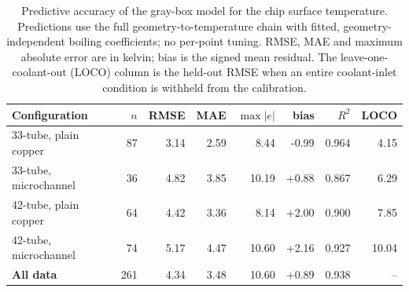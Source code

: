 \begin{table}[t]
\centering
\caption{Predictive accuracy of the gray-box model for the chip surface
temperature. Predictions use the full geometry-to-temperature chain with
fitted, geometry-independent boiling coefficients; no per-point tuning.
RMSE, MAE and maximum absolute error are in kelvin; bias is the signed mean
residual. The leave-one-coolant-out (LOCO) column is the held-out RMSE when an
entire coolant-inlet condition is withheld from the calibration.}
\label{tab:accuracy}
\begin{tabular}{lrrrrrrr}
\toprule
Configuration & $n$ & RMSE & MAE & $\max|e|$ & bias & $R^2$ & LOCO \\
\midrule
33-tube, plain copper & 87 & 3.14 & 2.59 & 8.44 & -0.99 & 0.964 & 4.15 \\
33-tube, microchannel & 36 & 4.82 & 3.85 & 10.19 & +0.88 & 0.867 & 6.29 \\
42-tube, plain copper & 64 & 4.42 & 3.36 & 8.14 & +2.00 & 0.900 & 7.85 \\
42-tube, microchannel & 74 & 5.17 & 4.47 & 10.60 & +2.16 & 0.927 & 10.04 \\
\midrule
\textbf{All data} & 261 & 4.34 & 3.48 & 10.60 & +0.89 & 0.938 & -- \\
\bottomrule
\end{tabular}
\end{table}
